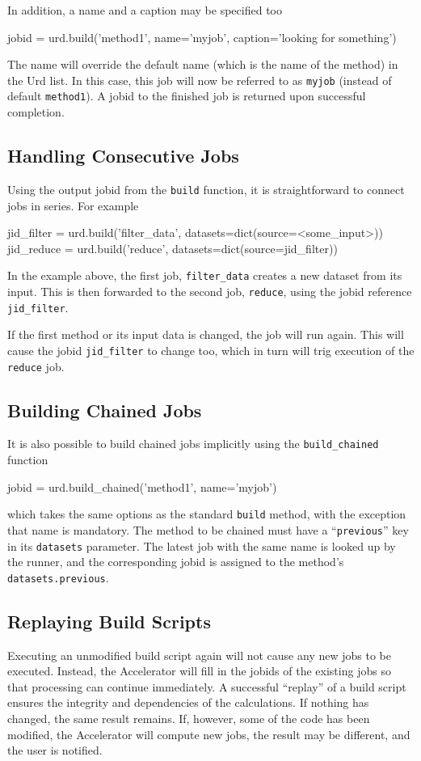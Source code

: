 In addition, a name and a caption may be specified too
\begin{python}
jobid = urd.build('method1', name='myjob', caption='looking for something')
\end{python}
The name will override the default name (which is the name of the
method) in the Urd list.  In this case, this job will now be referred
to as \texttt{myjob} (instead of default \texttt{method1}).  A jobid
to the finished job is returned upon successful completion.



\subsection{Handling Consecutive Jobs}
Using the output jobid from the \texttt{build} function, it is
straightforward to connect jobs in series.  For example
\begin{python}
jid_filter = urd.build('filter_data', datasets=dict(source=<some_input>))
jid_reduce = urd.build('reduce', datasets=dict(source=jid_filter))
\end{python}
In the example above, the first job, \texttt{filter\_data} creates a
new dataset from its input.  This is then forwarded to the second job,
\texttt{reduce}, using the jobid reference \texttt{jid\_filter}.

If the first method or its input data is changed, the job will run
again.  This will cause the jobid \texttt{jid\_filter} to change too,
which in turn will trig execution of the \texttt{reduce} job.



\subsection{Building Chained Jobs}
It is also possible to build chained jobs implicitly using the
\texttt{build\_chained} function
\begin{python}
  jobid = urd.build_chained('method1', name='myjob')
\end{python}
which takes the same options as the standard \texttt{build} method,
with the exception that name is mandatory.  The method to be chained
must have a ``\texttt{previous}'' key in its \texttt{datasets}
parameter.  The latest job with the same name is looked up by the
runner, and the corresponding jobid is assigned to the
method's \texttt{datasets.previous}.



\subsection{Replaying Build Scripts}
Executing an unmodified build script again will not cause any new jobs
to be executed.  Instead, the Accelerator will fill in the jobids of
the existing jobs so that processing can continue immediately.  A
successful ``replay'' of a build script ensures the integrity and
dependencies of the calculations.  If nothing has changed, the same
result remains.  If, however, some of the code has been modified, the
Accelerator will compute new jobs, the result may be different, and
the user is notified.




